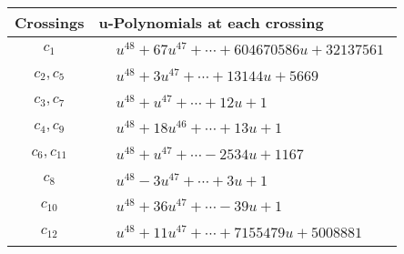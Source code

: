 \documentclass[1p]{elsarticle_modified}
\theoremstyle{definition}
\begin{document}
\begin{tabular}{m{50pt}|m{274pt}}
Crossings & \hspace{64pt}u-Polynomials at each crossing \\
\hline $$\begin{aligned}c_{1}\end{aligned}$$&$\begin{aligned}
&u^{48}+67 u^{47}+\cdots+604670586 u+32137561
\end{aligned}$\\
\hline $$\begin{aligned}c_{2},c_{5}\end{aligned}$$&$\begin{aligned}
&u^{48}+3 u^{47}+\cdots+13144 u+5669
\end{aligned}$\\
\hline $$\begin{aligned}c_{3},c_{7}\end{aligned}$$&$\begin{aligned}
&u^{48}+u^{47}+\cdots+12 u+1
\end{aligned}$\\
\hline $$\begin{aligned}c_{4},c_{9}\end{aligned}$$&$\begin{aligned}
&u^{48}+18 u^{46}+\cdots+13 u+1
\end{aligned}$\\
\hline $$\begin{aligned}c_{6},c_{11}\end{aligned}$$&$\begin{aligned}
&u^{48}+u^{47}+\cdots-2534 u+1167
\end{aligned}$\\
\hline $$\begin{aligned}c_{8}\end{aligned}$$&$\begin{aligned}
&u^{48}-3 u^{47}+\cdots+3 u+1
\end{aligned}$\\
\hline $$\begin{aligned}c_{10}\end{aligned}$$&$\begin{aligned}
&u^{48}+36 u^{47}+\cdots-39 u+1
\end{aligned}$\\
\hline $$\begin{aligned}c_{12}\end{aligned}$$&$\begin{aligned}
&u^{48}+11 u^{47}+\cdots+7155479 u+5008881
\end{aligned}$\\
\hline
\end{tabular}\\~\\
\end{document}
